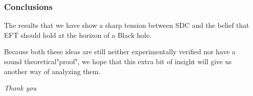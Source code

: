 \documentclass[hyperref={bookmarks=false},aspectratio=169]{beamer}
\begin{document}
\begin{frame}
    \frametitle{Conclusions}

    The results that we have show a sharp tension between SDC and the belief that EFT should hold at the horizon of a Black hole.

    Because both these ideas are still neither experimentally verified nor have a sound theoretical"proof", we hope that this extra bit of insight will give us another way of analyzing them.

\end{frame}


\begin{frame}{}
    \centering \Large
    \emph{Thank you}
\end{frame}











\end{document}
